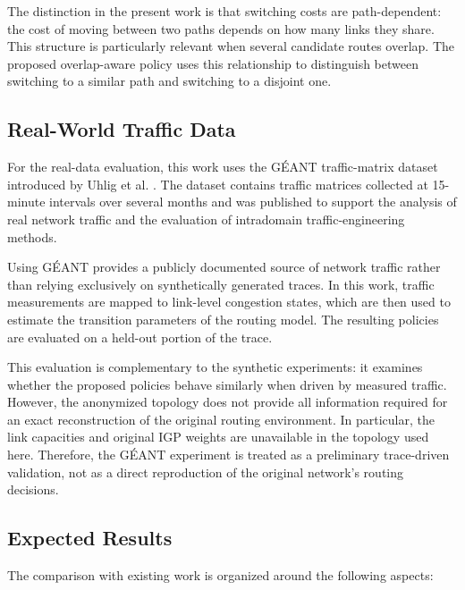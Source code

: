 \documentclass{amsart}
\begin{document}
The distinction in the present work is that switching costs are path-dependent: the cost of moving between two paths depends on how many links they share. This structure is particularly relevant when several candidate routes overlap. The proposed overlap-aware policy uses this relationship to distinguish between switching to a similar path and switching to a disjoint one.

\subsection{Real-World Traffic Data}

For the real-data evaluation, this work uses the GÉANT traffic-matrix dataset introduced by Uhlig et al. \cite{uhlig2006}. The dataset contains traffic matrices collected at 15-minute intervals over several months and was published to support the analysis of real network traffic and the evaluation of intradomain traffic-engineering methods.

Using GÉANT provides a publicly documented source of network traffic rather than relying exclusively on synthetically generated traces. In this work, traffic measurements are mapped to link-level congestion states, which are then used to estimate the transition parameters of the routing model. The resulting policies are evaluated on a held-out portion of the trace.

This evaluation is complementary to the synthetic experiments: it examines whether the proposed policies behave similarly when driven by measured traffic. However, the anonymized topology does not provide all information required for an exact reconstruction of the original routing environment. In particular, the link capacities and original IGP weights are unavailable in the topology used here. Therefore, the GÉANT experiment is treated as a preliminary trace-driven validation, not as a direct reproduction of the original network's routing decisions.

\subsection{Expected Results}

The comparison with existing work is organized around the following aspects:
\end{document}
